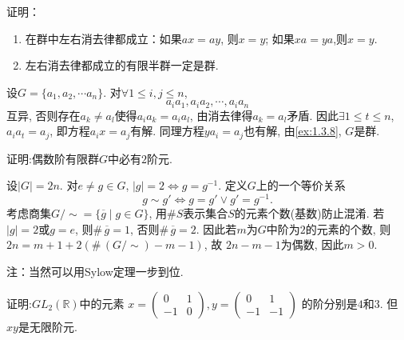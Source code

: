 \begin{problem}\label{ex:1.3.9}
    证明：
\begin{enumerate}[(1)]
    \item 在群中左右消去律都成立：如果$ax = ay$, 则$x = y$; 如果$xa = ya$,则$x = y$.
    \item 左右消去律都成立的有限半群一定是群.
\end{enumerate}
\end{problem}

\begin{solution}
    设$G = \{a_1, a_2, \cdots a_n\}$. 对$\forall 1 \leqslant i, j \leqslant n$,
\[
    a_ia_1, a_ia_2, \cdots, a_ia_n
\]
互异, 否则存在$a_k \neq a_l$使得$a_ia_k = a_ia_l$, 由消去律得$a_k = a_l$矛盾.
因此$\exists 1 \leqslant t \leqslant n$, $a_ia_t = a_j$, 即方程$a_ix = a_j$有解.
同理方程$ya_i = a_j$也有解, 由\ref{ex:1.3.8}, $G$是群.
\end{solution}

\begin{problem}
    证明:偶数阶有限群$G$中必有$2$阶元.
\end{problem}

\begin{solution}
    设$|G| = 2n$. 对$e \neq g \in G$, $|g| = 2 \iff g = g^{-1}$.
定义$G$上的一个等价关系
\[
    g \sim g' \iff g = g' \lor g' = g^{-1}.
\]
考虑商集$G/\sim = \{\overline{g} \mid g \in G\}$,
用$\#S$表示集合$S$的元素个数(基数)防止混淆.
若$|g| = 2$或$g = e$, 则$\#\, \overline{g} = 1$, 否则$\#\, \overline{g} = 2$.
因此若$m$为$G$中阶为$2$的元素的个数, 则$2n = m + 1 + 2(\#\, (G/\sim) - m - 1)$, 故
$2n - m - 1$为偶数, 因此$m > 0$.    

注：当然可以用Sylow定理一步到位.
\end{solution}

\begin{problem}
    证明:$GL_2(\mathbb{R})$中的元素
\(
x = \begin{pmatrix}
        0 & 1\\
        -1 & 0
\end{pmatrix}, 
y = \begin{pmatrix}
        0 & 1\\
        -1 & -1
\end{pmatrix}
\)
的阶分别是$4$和$3$. 但$xy$是无限阶元.
\end{problem}

